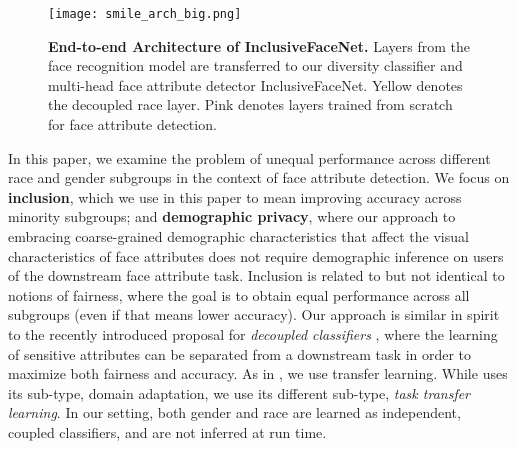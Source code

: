 \documentclass{article}
\begin{document}
\begin{figure}[h!]
    \centering
    \texttt{[image: smile\_arch\_big.png]}\vspace{-1.25em}
    \caption{{\bf End-to-end Architecture of InclusiveFaceNet.} Layers from the face recognition model are transferred to our diversity classifier and multi-head face attribute detector InclusiveFaceNet. Yellow denotes the decoupled race layer. Pink denotes layers trained from scratch for face attribute detection.}
    \vspace{-1.2em}
    \label{fig:smile_end2end}
\end{figure}


In this paper, we examine the problem of unequal performance across different race and gender subgroups in the context of face attribute detection. We focus on {\bf inclusion}, which we use in this paper to mean improving accuracy across minority subgroups; and {\bf demographic privacy}, where our approach to embracing coarse-grained demographic characteristics that affect the visual characteristics of face attributes does not require demographic inference on users of the downstream face attribute task. Inclusion is related to but not identical to notions of fairness, where the goal is to obtain equal performance across all subgroups (even if that means lower accuracy). Our approach is similar in spirit to the recently introduced proposal for {\it decoupled classifiers} \cite{DworkEtAl18}, where the learning of sensitive attributes can be separated from a downstream task in order to maximize both fairness and accuracy. As in \cite{DworkEtAl18}, we use transfer learning.  While \cite{DworkEtAl18} uses its sub-type, domain adaptation, we use its different sub-type, \textit{task transfer learning}. In our setting, both gender and race are learned as independent, coupled classifiers, and are not inferred at run time.


\end{document}

